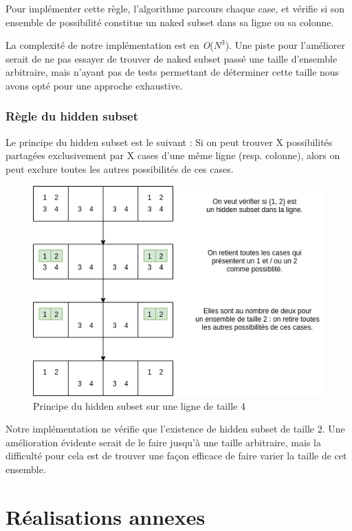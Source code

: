 \documentclass[1]{report}
\begin{document}
Pour implémenter cette règle, l'algorithme parcours chaque case, et vérifie si son ensemble de possibilité constitue un naked subset dans sa ligne ou sa colonne.\par
La complexité de notre implémentation est en \textit{O}($N^3$). Une piste pour l'améliorer serait de ne pas essayer de trouver de naked subset passé une taille d'ensemble arbitraire, mais n'ayant pas de tests permettant de déterminer cette taille nous avons opté pour une approche exhaustive.


\subsection{Règle du hidden subset}

Le principe du hidden subset est le suivant : Si on peut trouver X possibilités partagées exclusivement par X cases d'une m\^eme ligne (resp. colonne), alors on peut exclure toutes les autres possibilités de ces cases.

\begin{figure}[H]
\centering
   \includegraphics[scale=0.45]{hidden_subset.png}
   \caption{Principe du hidden subset sur une ligne de taille 4}
\end{figure}

Notre implémentation ne vérifie que l'existence de hidden subset de taille 2. Une amélioration évidente serait de le faire jusqu'à une taille arbitraire, mais la difficulté pour cela est de trouver une façon efficace de faire varier la taille de cet ensemble.\par

\chapter{Réalisations annexes}
\end{document}
